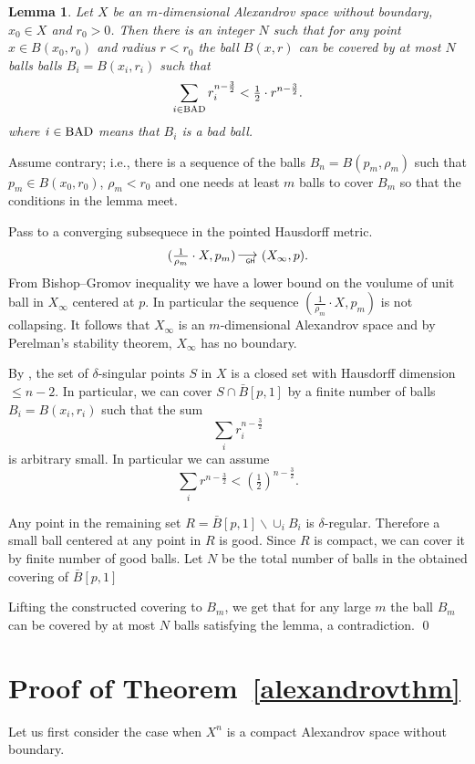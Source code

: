 \documentclass[12pt,leqno]{amsart}
\numberwithin{equation}{section}
\newtheorem{lem}[thm]{Lemma}
\theoremstyle{definition}
\theoremstyle{remark}
\def\BAD{\mathop{\rm BAD}\nolimits}%
\newcommand*{\GHto}{\mathbin{\begin{picture}(16,3.5)
\put(-1,1){$\longrightarrow$}
\put(13,-3){\llap{\text{\sf\tiny GH}}}
\end{picture}}}
\def\parit#1{\medskip\noindent{\it #1}}
\def\qeds{\qed\par\medskip}
\begin{document}
\begin{lem}\label{lem:covering}
Let $X$ be an $m$-dimensional Alexandrov space without boundary,
$x_0\in X$
and $r_0>0$.
Then there is an integer $N$ such that for any point $x\in B(x_0,r_0)$ and radius $r<r_0$
the ball $B(x,r)$ can be covered by at most $N$ balls
balls $B_i=B(x_i,r_i)$ such that
$$\sum_{i\in \BAD}r_i^{n-\frac32}< \tfrac12\cdot r^{n-\frac32}.$$
where $i\in \BAD$ means that $B_i$ is a bad ball.

\end{lem}

\parit{Proof.}
Assume contrary;
i.e., there is a sequence of the balls
$B_n=B(p_m,\rho_m)$
such that $p_m\in B(x_0,r_0)$,
$\rho_m<r_0$ and
one needs at least $m$ balls to cover $B_m$ so that the conditions in the lemma meet.

Pass to a converging subsequece in the pointed Hausdorff metric.
$$(\tfrac1{\rho_m}\cdot X,p_m)\GHto (X_\infty,p).$$
From Bishop--Gromov inequality we have a lower bound on the voulume of unit ball in $X_\infty$ centered at $p$.
In particular the sequence $(\tfrac1{\rho_m}\cdot X,p_m)$
is not collapsing.
It follows that $X_\infty$ is an $m$-dimensional Alexandrov space
and by Perelman's stability theorem, $X_\infty$ has no boundary.

By \cite{BGP}, the set of $\delta$-singular points $S$ in $X$
is a closed set with Hausdorff dimension $\le n-2$.
In particular, we can cover $S\cap \bar B[p,1]$ by a finite number of balls
$B_i=B(x_i,r_i)$ such that the sum
$$\sum_ir_i^{n-\frac32}$$
is arbitrary small.
In particular we can assume
$$\sum_ir^{n-\frac32}<(\tfrac12)^{n-\frac32}.$$

Any point in the remaining set $R=\bar B[p,1]\backslash \cup_i B_i$
is $\delta$-regular.
Therefore a small ball centered at any point in $R$ is good.
Since $R$ is compact,
we can cover it by finite number of good balls.
Let $N$ be the total number of balls in the obtained covering of $\bar B[p,1]$

Lifting the constructed covering to $B_m$,
we get that for any large $m$
the ball $B_m$ can be covered by at most $N$ balls satisfying the lemma,
a contradiction.
\qeds

\section{Proof of Theorem~\ref{alexandrovthm}}

\parit{Proof.}

Let us first consider the case when $X^n$ is a compact Alexandrov space   without boundary.
\end{document}
